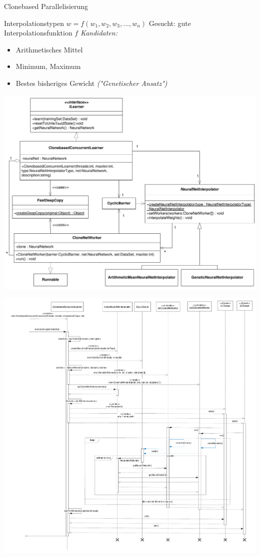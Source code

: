 \documentclass[18pt]{beamer}
\begin{document}
\begin{frame}[allowframebreaks]{Clonebased Parallelisierung}
	\framebreak
		\begin{block}{Interpolationstypen}
			$w = f(w_1,w_2,w_3,...,w_n)$
			\newline
			Gesucht: gute Interpolationsfunktion $f$
			\newline
			\newline
			\emph{Kandidaten:}
			\begin{itemize}
				\item Arithmetisches Mittel
				\item Minimum, Maximum
				\item Bestes bisheriges Gewicht \emph{("Genetischer Ansatz")}
			\end{itemize}
		\end{block}
		
	\framebreak
		\includegraphics[height=0.8\textheight]{Grafiken/Clonebased_classdiagram}
		
	\framebreak
		\includegraphics[height=0.8\textheight]{Grafiken/Clonebased_sequencediagram}
	\end{frame}
\end{document}
